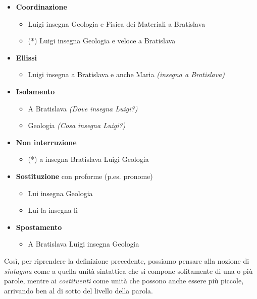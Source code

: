 \documentclass[
  a4paper,
  twoside,
  11pt,
  chapterprefix=false,
  bibliography=totocnumbered,
  listof=flat]{scrbook}
\providecommand{\tightlist}{%
  \setlength{\itemsep}{0pt}\setlength{\parskip}{0pt}}
\begin{document}
\begin{itemize}
\tightlist
\item
  \textbf{Coordinazione}

  \begin{itemize}
  \tightlist
  \item
    Luigi insegna Geologia e Fisica dei Materiali a Bratislava
  \item
    (*) Luigi insegna Geologia e veloce a Bratislava
  \end{itemize}
\item
  \textbf{Ellissi}

  \begin{itemize}
  \tightlist
  \item
    Luigi insegna a Bratislava e anche Maria \emph{(insegna a Bratislava)}
  \end{itemize}
\item
  \textbf{Isolamento}

  \begin{itemize}
  \tightlist
  \item
    A Bratislava \emph{(Dove insegna Luigi?)}
  \item
    Geologia \emph{(Cosa insegna Luigi?)}
  \end{itemize}
\item
  \textbf{Non interruzione}

  \begin{itemize}
  \tightlist
  \item
    (*) a insegna Bratislava Luigi Geologia
  \end{itemize}
\item
  \textbf{Sostituzione} con proforme (p.es. pronome)

  \begin{itemize}
  \tightlist
  \item
    Lui insegna Geologia
  \item
    Lui la insegna lì
  \end{itemize}
\item
  \textbf{Spostamento}

  \begin{itemize}
  \tightlist
  \item
    A Bratislava Luigi insegna Geologia
  \end{itemize}
\end{itemize}

Così, per riprendere la definizione precedente, possiamo pensare alla nozione di \emph{sintagma} come a quella unità sintattica che si compone solitamente di una o più parole, mentre ai \emph{costituenti} come unità che possono anche essere più piccole, arrivando ben al di sotto del livello della parola.
\end{document}

